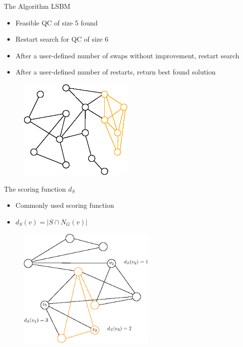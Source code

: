 \documentclass{beamer}
\begin{document}
\begin{frame}{The Algorithm LSBM}
    \begin{itemize}
        \item<1-> Feasible QC of size 5 found
        \item<2-> Restart search for QC of size 6
        \item<3-> After a user-defined number of swaps without improvement, restart search
        \item<4-> After a user-defined number of restarts, return best found solution
    \end{itemize}
    \begin{figure}
        \centering
        \includegraphics[width=0.5\textwidth]{graphics/algorithm_poster_6.eps}
    \end{figure}
\end{frame}

\begin{frame}{The scoring function $d_S$}
    \begin{itemize}
        \item Commonly used scoring function
        \item $d_S(v) = | S \cap N_G(v) |$
    \end{itemize}
    \begin{figure}
        \centering
        \includegraphics[width=0.6\textwidth]{graphics/ds1.eps}
    \end{figure}
\end{frame}
\end{document}

